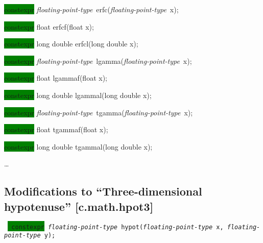 \documentclass[prd,twocolumn,amsmath,amssymb,nofootinbib,eqsecnum]{revtex4-1}
\newcommand{\code}[1]{{\tt #1}}
\newcommand{\highlight}[1]{\colorbox{green}{\!\!\!\! #1}}
\newcommand{\fptype}{{\it floating-point-type}}
\begin{document}
{\vspace{2ex}

\highlight{constexpr} \fptype\ erfc(\fptype\ x);

\highlight{constexpr} float erfcf(float x);

\highlight{constexpr} long double erfcl(long double x);

\vspace{2ex}


\highlight{constexpr} \fptype\ lgamma(\fptype\ x);

\highlight{constexpr} float lgammaf(float x);

\highlight{constexpr} long double lgammal(long double x);

\vspace{2ex}

\highlight{constexpr} \fptype\ tgamma(\fptype\ x);

\highlight{constexpr} float tgammaf(float x);

\highlight{constexpr} long double tgammal(long double x);

\ldots

}


\subsection{Modifications to ``Three-dimensional hypotenuse''  [c.math.hpot3]}

\code{
	\highlight{constexpr} \fptype\ hypot(\fptype\ x, \fptype\ y);
}
\end{document}
